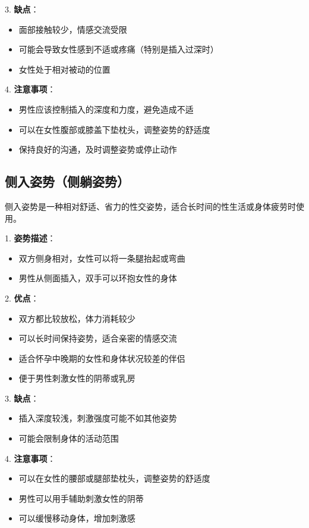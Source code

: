 \documentclass[12pt,UTF8]{ctexbook}
\begin{document}
3. \textbf{缺点}：
  \begin{itemize}
  \item 面部接触较少，情感交流受限
  \item 可能会导致女性感到不适或疼痛（特别是插入过深时）
  \item 女性处于相对被动的位置
  \end{itemize}

4. \textbf{注意事项}：
  \begin{itemize}
  \item 男性应该控制插入的深度和力度，避免造成不适
  \item 可以在女性腹部或膝盖下垫枕头，调整姿势的舒适度
  \item 保持良好的沟通，及时调整姿势或停止动作
  \end{itemize}

\subsection{侧入姿势（侧躺姿势）}

侧入姿势是一种相对舒适、省力的性交姿势，适合长时间的性生活或身体疲劳时使用。

1. \textbf{姿势描述}：
  \begin{itemize}
  \item 双方侧身相对，女性可以将一条腿抬起或弯曲
  \item 男性从侧面插入，双手可以环抱女性的身体
  \end{itemize}

2. \textbf{优点}：
  \begin{itemize}
  \item 双方都比较放松，体力消耗较少
  \item 可以长时间保持姿势，适合亲密的情感交流
  \item 适合怀孕中晚期的女性和身体状况较差的伴侣
  \item 便于男性刺激女性的阴蒂或乳房
  \end{itemize}

3. \textbf{缺点}：
  \begin{itemize}
  \item 插入深度较浅，刺激强度可能不如其他姿势
  \item 可能会限制身体的活动范围
  \end{itemize}

4. \textbf{注意事项}：
  \begin{itemize}
  \item 可以在女性的腰部或腿部垫枕头，调整姿势的舒适度
  \item 男性可以用手辅助刺激女性的阴蒂
  \item 可以缓慢移动身体，增加刺激感
  \end{itemize}
\end{document}
